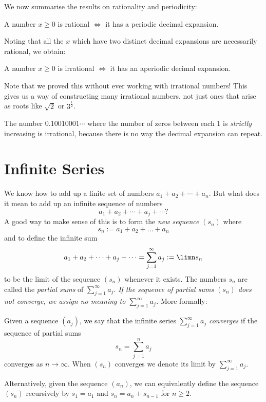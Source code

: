 \documentclass[11pt,dvipsnames]{book}
\numberwithin{figure}{section} %
\numberwithin{table}{section} %
\begin{document}
We now summarise the results on rationality and periodicity:
\begin{theorem}\label{87}
A number $x  \geq 0$ is rational $\iff$ it has a periodic decimal expansion.
\end{theorem}
Noting that all the $x$ which have two distinct decimal expansions are necessarily rational, we obtain:
\begin{corollary}\label{88}
A number $x  \geq 0$ is irrational $\iff$ it has an aperiodic decimal expansion.
\end{corollary}
Note that we proved this without ever working with irrational numbers! This gives us a way of constructing many irrational numbers, not just ones that arise as roots like $\sqrt{2}$ or $3^{\frac{1}{2}}$.

\begin{example}
The number $0.10010001\cdots $ where the number of zeros between each $1$ is {\em strictly} increasing is irrational, because there is no way the decimal expansion can repeat.
\end{example}

\section{Infinite Series}%
\label{series}
We know how to add up a finite set of numbers $a_1 + a_2 + \cdots + a_n$. But what does it mean to add up an infinite sequence of numbers
\[ a_1 + a_2 + \cdots + a_j + \cdots ?\]
A good way to make sense of this is to form the {\em new sequence} $(s_n)$ where
\[ s_n := a_1 + a_2 + \dots + a_n\]
and to define the infinite sum
$$a_1 + a_2 + \cdots + a_j + \cdots = \sum_{j=1}^\infty a_j := \limn s_n$$
to be the limit of the sequence $(s_n)$ whenever it exists. The numbers $s_n$ are called the {\em partial sums} of $\sum_{j=1}^\infty a_j$. {\em If the sequence of partial sums $(s_n)$ does not converge, we assign no meaning to $\sum_{j=1}^\infty a_j$.} More formally:
\begin{definition}
Given a sequence $(a_{j})$, we say that the infinite series $\sum_{j=1}^\infty a_{j}$ {\it converges} if the sequence of partial sums
\[
s_{n}=\sum_{j=1}^{n}a_{j}
\]
converges as $n\rightarrow\infty$. When $(s_n)$ converges we denote its limit by $\sum_{j=1}^{\infty}a_{j}$.
\end{definition}
Alternatively, given the sequence $(a_n)$, we can equivalently define the sequence $(s_n)$ recursively by
$s_1 = a_1$ and
$s_{n} = a_n + s_{n-1}$
for $n \geq 2$.
\end{document}
